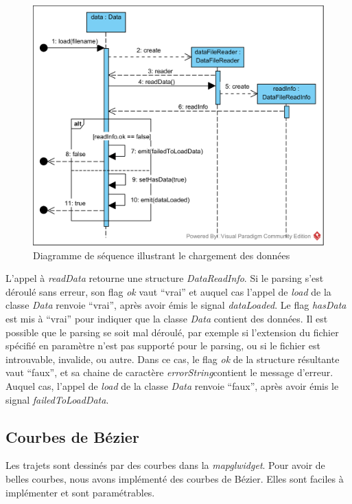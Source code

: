 \documentclass[12pt]{article}
\begin{document}
		\begin{figure}[!h]
		\begin{center}
		\includegraphics[scale=1]{dia_sequence_loadData.png}
		\caption{Diagramme de séquence illustrant le chargement des données}
		\label{fig:dia_seq_chargement_donnees}
		\end{center}
		\end{figure}
	
		L’appel à \textit{readData} retourne une structure \textit{DataReadInfo}. Si le parsing s’est déroulé sans erreur, son flag \textit{ok} vaut “vrai” et auquel cas l’appel de \textit{load} de la classe \textit{Data} renvoie “vrai”, après avoir émis le signal \textit{dataLoaded}. Le flag \textit{hasData} est mis à “vrai” pour indiquer que la classe \textit{Data} contient des données. Il est possible que le parsing se soit mal déroulé, par exemple si l’extension du fichier spécifié en paramètre n’est pas supporté pour le parsing, ou si le fichier est introuvable, invalide, ou autre. Dans ce cas, le flag \textit{ok} de la structure résultante vaut “faux”, et sa chaine de caractère \textit{errorString}contient le message d’erreur. Auquel cas, l’appel de \textit{load} de la classe \textit{Data} renvoie “faux”, après avoir émis le signal \textit{failedToLoadData}.
		
		\newpage
		\subsection{Courbes de Bézier}
		Les trajets sont dessinés par des courbes dans la \textit{mapglwidget}. Pour avoir de belles
		courbes, nous avons implémenté des courbes de Bézier. Elles sont faciles à implémenter et sont
		paramétrables.\\
		
\end{document}

